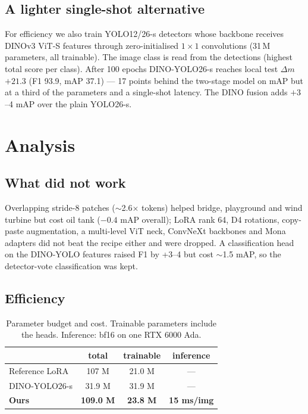 \documentclass[10pt,twocolumn,letterpaper]{article}
\newcommand{\dm}{\ensuremath{\Delta m}}
\begin{document}
\subsection{A lighter single-shot alternative}
\label{sec:yolo}
For efficiency we also train YOLO12/26-s detectors whose backbone receives
DINOv3 ViT-S features through zero-initialised $1\times1$ convolutions
(31\,M parameters, all trainable). The image class is read from the
detections (highest total score per class). After 100 epochs DINO-YOLO26-s
reaches local test \dm{} $+21.3$ (F1 93.9, mAP 37.1) --- 17 points behind the
two-stage model on mAP but at a third of the parameters and a single-shot
latency. The DINO fusion adds $+3$--4 mAP over the plain YOLO26-s.

\section{Analysis}
\subsection{What did not work}
\label{sec:negative}
Overlapping stride-8 patches ($\sim$2.6$\times$ tokens) helped bridge,
playground and wind turbine but cost oil tank ($-0.4$ mAP overall); LoRA rank
64, D4 rotations, copy-paste augmentation, a multi-level ViT neck, ConvNeXt
backbones and Mona adapters did not beat the recipe either and were dropped.
A classification head on the DINO-YOLO features raised F1 by +3--4 but cost
$\sim$1.5 mAP, so the detector-vote classification was kept.

\subsection{Efficiency}
\begin{table}[t]
\centering\small
\begin{tabular}{@{}lccc@{}}
\toprule
 & total & trainable & inference \\
\midrule
Reference LoRA & 107 M & 21.0 M & --- \\
DINO-YOLO26-s & 31.9 M & 31.9 M & --- \\
\textbf{Ours} & \textbf{109.0 M} & \textbf{23.8 M} & \textbf{15 ms/img} \\
\bottomrule
\end{tabular}
\caption{Parameter budget and cost. Trainable parameters include the heads.
Inference: bf16 on one RTX 6000 Ada.}
\label{tab:eff}
\end{table}
\end{document}
